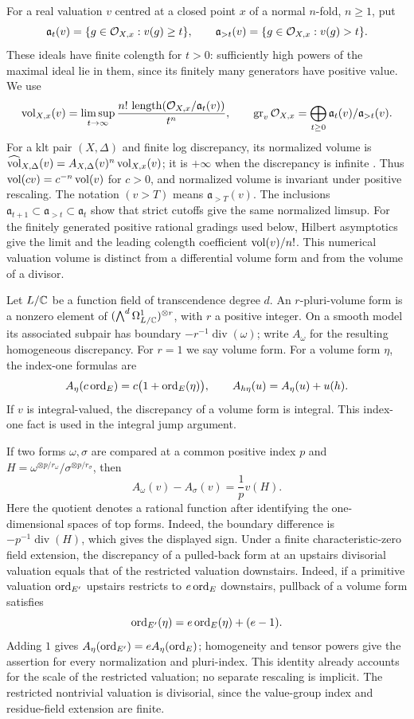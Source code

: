 For a real valuation $v$ centred at a closed point $x$ of a normal
$n$-fold, $n\ge1$, put
\[
 \mathfrak a_t(v)=\{g\in\mathcal O_{X,x}:v(g)\ge t\},\qquad
 \mathfrak a_{>t}(v)=\{g\in\mathcal O_{X,x}:v(g)>t\}.
\]
These ideals have finite colength for $t>0$: sufficiently high powers
of the maximal ideal lie in them, since its finitely many generators
have positive value. We use
\[
 \operatorname{vol}_{X,x}(v)=\limsup_{t\to\infty}
 \frac{n!\,\operatorname{length}(\mathcal O_{X,x}/\mathfrak a_t(v))}{t^n},
 \qquad
 \operatorname{gr}_v\mathcal O_{X,x}=\bigoplus_{t\ge0}
             \mathfrak a_t(v)/\mathfrak a_{>t}(v).
\]
For a klt pair $(X,\Delta)$ and finite log discrepancy, its normalized
volume is $\widehat{\operatorname{vol}}_{X,\Delta}(v)=A_{X,\Delta}(v)^n\operatorname{vol}_{X,x}(v)$;
it is $+\infty$ when the discrepancy is infinite
\cite[Definitions~2.4--2.5]{MinimizerUniqueness}.
Thus $\operatorname{vol}(cv)=c^{-n}\operatorname{vol}(v)$ for $c>0$, and normalized volume is
invariant under positive rescaling. The notation $(v>T)$ means
$\mathfrak a_{>T}(v)$. The inclusions
$\mathfrak a_{t+1}\subset\mathfrak a_{>t}\subset\mathfrak a_t$
show that strict cutoffs give the same normalized limsup. For the
finitely generated positive rational gradings used below, Hilbert
asymptotics give the limit and the leading colength coefficient
$\operatorname{vol}(v)/n!$. This numerical valuation volume is distinct from a
differential volume form and from the volume of a divisor.

Let $L/\mathbb C$ be a function field of transcendence degree $d$. An
$r$-pluri-volume form is a nonzero element of
$(\bigwedge^d\Omega^1_{L/\mathbb C})^{\otimes r}$, with $r$ a positive
integer. On a smooth model its associated subpair has boundary
$-r^{-1}\operatorname{div}(\omega)$; write $A_\omega$ for the
resulting homogeneous discrepancy. For $r=1$ we say volume form.
For a volume form $\eta$, the index-one formulas are
\begin{equation}\label{glob:form-discrepancy}
 A_\eta(c\operatorname{ord}_E)=c\bigl(1+\operatorname{ord}_E(\eta)\bigr),
 \qquad A_{h\eta}(u)=A_\eta(u)+u(h).
\end{equation}
If $v$ is integral-valued, the discrepancy of a volume form is
integral. This index-one fact is used in the integral jump argument.

If two forms $\omega,\sigma$ are compared at a common positive index
$p$ and $H=\omega^{\otimes p/r_\omega}/
\sigma^{\otimes p/r_\sigma}$, then
\[
 A_\omega(v)-A_\sigma(v)=\frac{1}{p}v(H).
\]
Here the quotient denotes a rational function after identifying the
one-dimensional spaces of top forms. Indeed, the boundary difference
is $-p^{-1}\operatorname{div}(H)$, which gives the displayed sign.
Under a finite characteristic-zero field extension, the discrepancy
of a pulled-back form at an upstairs divisorial valuation equals that
of the restricted valuation downstairs. Indeed, if a primitive
valuation $\operatorname{ord}_{E'}$ upstairs restricts to $e\operatorname{ord}_E$ downstairs,
pullback of a volume form satisfies
\[
 \operatorname{ord}_{E'}(\eta)=e\operatorname{ord}_E(\eta)+(e-1).
\]
Adding $1$ gives $A_\eta(\operatorname{ord}_{E'})=eA_\eta(\operatorname{ord}_E)$; homogeneity
and tensor powers give the assertion for every normalization and
pluri-index. This identity already accounts for the scale of the
restricted valuation; no separate rescaling is implicit. The
restricted nontrivial valuation is divisorial, since the value-group
index and residue-field extension are finite.

